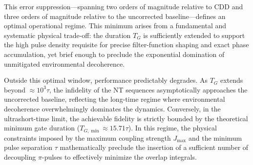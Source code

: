 \documentclass[%
 reprint,
superscriptaddress,
 amsmath,amssymb,
 aps,
pra,
floatfix,
]{revtex4-2}
\begin{document}
This error suppression—spanning two orders of magnitude relative to CDD and three orders of magnitude relative to the uncorrected baseline—defines an optimal operational regime. This minimum arises from a fundamental and systematic physical trade-off: the duration $T_G$ is sufficiently extended to support the high pulse density requisite for precise filter-function shaping and exact phase accumulation, yet brief enough to preclude the exponential domination of unmitigated environmental decoherence.

Outside this optimal window, performance predictably degrades. As $T_G$ extends beyond $\approx 10^3\tau$, the infidelity of the NT sequences asymptotically approaches the uncorrected baseline, reflecting the long-time regime where environmental decoherence overwhelmingly dominates the dynamics. Conversely, in the ultrashort-time limit, the achievable fidelity is strictly bounded by the theoretical minimum gate duration ($T_{G,\min} \approx 15.71\tau$). In this regime, the physical constraints imposed by the maximum coupling strength $J_{\text{max}}$ and the minimum pulse separation $\tau$ mathematically preclude the insertion of a sufficient number of decoupling $\pi$-pulses to effectively minimize the overlap integrals.
\end{document}
